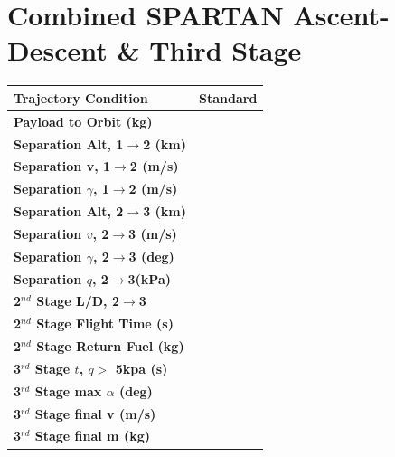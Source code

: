 \section{Combined SPARTAN Ascent-Descent \& Third Stage}
\begin{table}[ht]
	\centering
\begin{tabular}{l c } 
	\hline \textbf{Trajectory Condition}
	& Standard

	\\
	\hline \textbf{Payload to Orbit (kg)}
	& \PayloadToOrbitStandard
	\\
	\textbf{Separation Alt, 1$\rightarrow$2 (km)}
	& \firstsecondSeparationAltStandard
	\\
	\textbf{Separation v, 1$\rightarrow$2 (m/s)}
	& \firstsecondSeparationvStandard
	\\
	\textbf{Separation $\gamma$, 1$\rightarrow$2 (m/s)}
	& \firstsecondSeparationgammaStandard
	\\
	\textbf{Separation Alt, 2$\rightarrow$3 (km)}
	& \secondthirdSeparationAltStandard
	\\
	\textbf{Separation $v$, 2$\rightarrow$3 (m/s)}
	& \secondthirdSeparationvStandard
	\\
	\textbf{Separation $\gamma$, 2$\rightarrow$3 (deg)}
	& \secondthirdSeparationgammaStandard
	\\
	\textbf{Separation $q$, 2$\rightarrow$3(kPa)}
	& \secondthirdSeparationqStandard
	\\
	\textbf{2$^{nd}$ Stage L/D, 2$\rightarrow$3}
	& \secondthirdSeparationLDStandard
	\\
	\textbf{2$^{nd}$ Stage Flight Time (s)}
	& \secondFlightTimeStandard
	\\
	\textbf{2$^{nd}$ Stage Return Fuel (kg)}
	& \returnFuelStandard
	\\
	\textbf{3$^{rd}$ Stage $t$, $q >$ 5kpa (s)}
	& \thirdqOverFiveStandard
	\\
	\textbf{3$^{rd}$ Stage max $\alpha$ (deg)}
	& \thirdmaxAoAStandard
	\\
	\textbf{3$^{rd}$ Stage final v (m/s)}
	& \thirdcircvStandard
	\\
	\textbf{3$^{rd}$ Stage final m (kg)}
	& \thirdcircmStandard
	\\
	\hline 
\end{tabular} 
\end{table}

